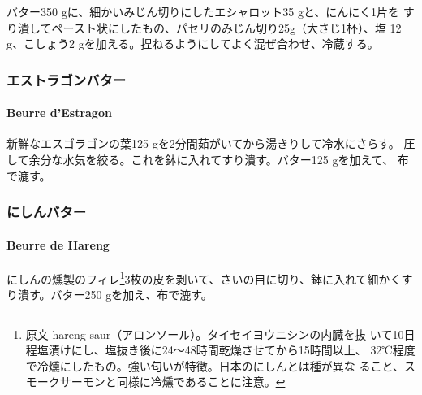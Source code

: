 \begin{recette}
バター350 gに、細かいみじん切りにしたエシャロット35 gと、にんにく1片を
すり潰してペースト状にしたもの、パセリのみじん切り25g（大さじ1杯）、塩
12 g、こしょう2 gを加える。捏ねるようにしてよく混ぜ合わせ、冷蔵する。

\maeaki

\hypertarget{ux30a8ux30b9ux30c8ux30e9ux30b4ux30f3ux30d0ux30bfux30fc}{%
\subsubsection{エストラゴンバター}\label{ux30a8ux30b9ux30c8ux30e9ux30b4ux30f3ux30d0ux30bfux30fc}}

\hypertarget{beurre-d-estragon}{%
\paragraph{Beurre d'Estragon}\label{beurre-d-estragon}}


新鮮なエスゴラゴンの葉125 gを2分間茹がいてから湯きりして冷水にさらす。
圧して余分な水気を絞る。これを鉢に入れてすり潰す。バター125 gを加えて、
布で漉す。

\maeaki

\hypertarget{ux306bux3057ux3093ux30d0ux30bfux30fc}{%
\subsubsection{にしんバター}\label{ux306bux3057ux3093ux30d0ux30bfux30fc}}

\hypertarget{beurre-de-hereng}{%
\paragraph{Beurre de Hareng}\label{beurre-de-hereng}}


にしんの燻製のフィレ\footnote{原文 hareng
  saur（アロンソール）。タイセイヨウニシンの内臓を抜
  いて10日程塩漬けにし、塩抜き後に24〜48時間乾燥させてから15時間以上、
  32℃程度で冷燻にしたもの。強い匂いが特徴。日本のにしんとは種が異な
  ること、スモークサーモンと同様に冷燻であることに注意。}3枚の皮を剥いて、さいの目に切り、鉢に入れて細かくすり潰す。バター250
gを加え、布で漉す。


\end{recette}
